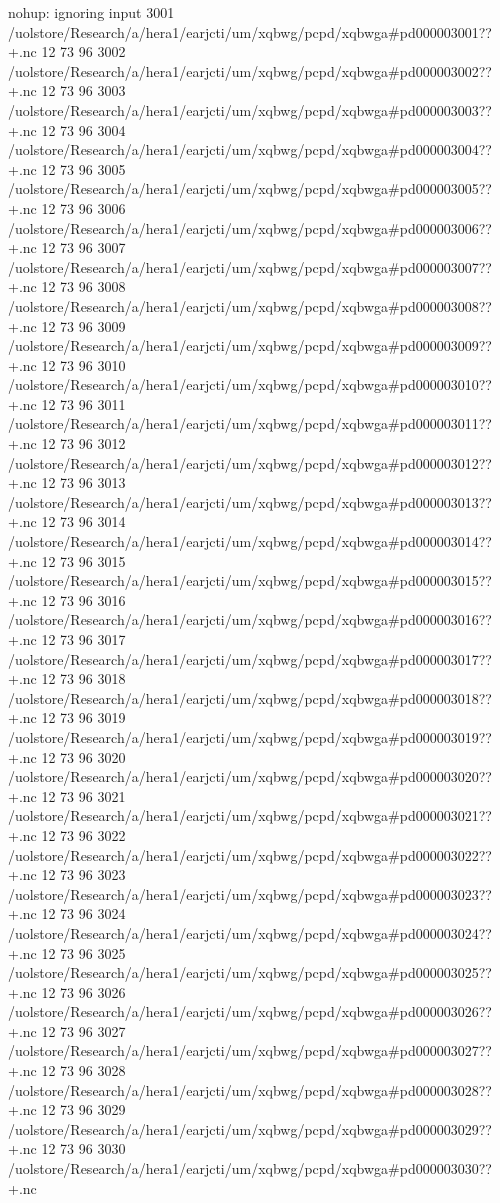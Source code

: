 nohup: ignoring input
3001
/uolstore/Research/a/hera1/earjcti/um/xqbwg/pcpd/xqbwga#pd000003001??+.nc
12 73 96
3002
/uolstore/Research/a/hera1/earjcti/um/xqbwg/pcpd/xqbwga#pd000003002??+.nc
12 73 96
3003
/uolstore/Research/a/hera1/earjcti/um/xqbwg/pcpd/xqbwga#pd000003003??+.nc
12 73 96
3004
/uolstore/Research/a/hera1/earjcti/um/xqbwg/pcpd/xqbwga#pd000003004??+.nc
12 73 96
3005
/uolstore/Research/a/hera1/earjcti/um/xqbwg/pcpd/xqbwga#pd000003005??+.nc
12 73 96
3006
/uolstore/Research/a/hera1/earjcti/um/xqbwg/pcpd/xqbwga#pd000003006??+.nc
12 73 96
3007
/uolstore/Research/a/hera1/earjcti/um/xqbwg/pcpd/xqbwga#pd000003007??+.nc
12 73 96
3008
/uolstore/Research/a/hera1/earjcti/um/xqbwg/pcpd/xqbwga#pd000003008??+.nc
12 73 96
3009
/uolstore/Research/a/hera1/earjcti/um/xqbwg/pcpd/xqbwga#pd000003009??+.nc
12 73 96
3010
/uolstore/Research/a/hera1/earjcti/um/xqbwg/pcpd/xqbwga#pd000003010??+.nc
12 73 96
3011
/uolstore/Research/a/hera1/earjcti/um/xqbwg/pcpd/xqbwga#pd000003011??+.nc
12 73 96
3012
/uolstore/Research/a/hera1/earjcti/um/xqbwg/pcpd/xqbwga#pd000003012??+.nc
12 73 96
3013
/uolstore/Research/a/hera1/earjcti/um/xqbwg/pcpd/xqbwga#pd000003013??+.nc
12 73 96
3014
/uolstore/Research/a/hera1/earjcti/um/xqbwg/pcpd/xqbwga#pd000003014??+.nc
12 73 96
3015
/uolstore/Research/a/hera1/earjcti/um/xqbwg/pcpd/xqbwga#pd000003015??+.nc
12 73 96
3016
/uolstore/Research/a/hera1/earjcti/um/xqbwg/pcpd/xqbwga#pd000003016??+.nc
12 73 96
3017
/uolstore/Research/a/hera1/earjcti/um/xqbwg/pcpd/xqbwga#pd000003017??+.nc
12 73 96
3018
/uolstore/Research/a/hera1/earjcti/um/xqbwg/pcpd/xqbwga#pd000003018??+.nc
12 73 96
3019
/uolstore/Research/a/hera1/earjcti/um/xqbwg/pcpd/xqbwga#pd000003019??+.nc
12 73 96
3020
/uolstore/Research/a/hera1/earjcti/um/xqbwg/pcpd/xqbwga#pd000003020??+.nc
12 73 96
3021
/uolstore/Research/a/hera1/earjcti/um/xqbwg/pcpd/xqbwga#pd000003021??+.nc
12 73 96
3022
/uolstore/Research/a/hera1/earjcti/um/xqbwg/pcpd/xqbwga#pd000003022??+.nc
12 73 96
3023
/uolstore/Research/a/hera1/earjcti/um/xqbwg/pcpd/xqbwga#pd000003023??+.nc
12 73 96
3024
/uolstore/Research/a/hera1/earjcti/um/xqbwg/pcpd/xqbwga#pd000003024??+.nc
12 73 96
3025
/uolstore/Research/a/hera1/earjcti/um/xqbwg/pcpd/xqbwga#pd000003025??+.nc
12 73 96
3026
/uolstore/Research/a/hera1/earjcti/um/xqbwg/pcpd/xqbwga#pd000003026??+.nc
12 73 96
3027
/uolstore/Research/a/hera1/earjcti/um/xqbwg/pcpd/xqbwga#pd000003027??+.nc
12 73 96
3028
/uolstore/Research/a/hera1/earjcti/um/xqbwg/pcpd/xqbwga#pd000003028??+.nc
12 73 96
3029
/uolstore/Research/a/hera1/earjcti/um/xqbwg/pcpd/xqbwga#pd000003029??+.nc
12 73 96
3030
/uolstore/Research/a/hera1/earjcti/um/xqbwg/pcpd/xqbwga#pd000003030??+.nc
